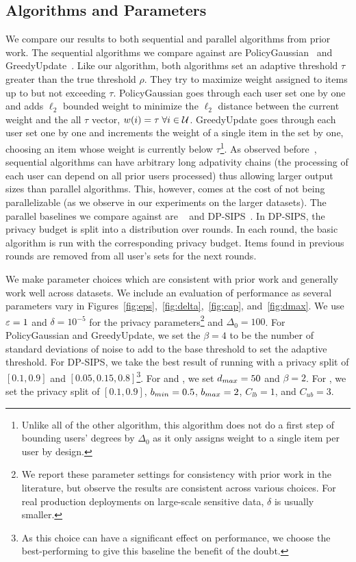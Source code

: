 \subsection{Algorithms and Parameters}

We compare our results to both sequential and parallel algorithms from prior work. The sequential algorithms we compare against are PolicyGaussian~\cite{gopi2020dpunion} and GreedyUpdate~\cite{carvalho2022incorporatingitem}. Like our algorithm, both algorithms set an adaptive threshold $\tau$ greater than the true threshold $\rho$. They try to maximize weight assigned to items up to but not exceeding $\tau$. PolicyGaussian goes through each user set one by one and adds $\ell_2$ bounded weight to minimize the $\ell_2$ distance between the current weight and the all $\tau$ vector, $w(i) = \tau \; \forall i \in \mathcal{U}$. GreedyUpdate goes through each user set one by one and increments the weight of a single item in the set by one, choosing an item whose weight is currently below $\tau$\footnote{Unlike all of the other algorithm, this algorithm does not do a first step of bounding users' degrees by $\Delta_0$ as it only assigns weight to a single item per user by design.}.
As observed before~\cite{swanberg2023dpsips}, sequential algorithms can have arbitrary long adpativity chains (the processing of each user can depend on all prior users processed) thus allowing larger output sizes than parallel algorithms. This, however, comes at the cost of not being parallelizable (as we observe in our experiments on the larger datasets).     
The parallel baselines we compare against are \basicalgo{}~\cite{korolova2009releasing, gopi2020dpunion} and DP-SIPS~\cite{swanberg2023dpsips}. In DP-SIPS, the privacy budget is split into a distribution over rounds. In each round, the basic algorithm is run with the corresponding privacy budget. Items found in previous rounds are removed from all user's sets for the next rounds.

We make parameter choices which are consistent with prior work and generally work well across datasets.
We include an evaluation of performance as several parameters vary in Figures~\ref{fig:eps},~\ref{fig:delta},~\ref{fig:cap}, and~\ref{fig:dmax}.
We use $\varepsilon = 1$ and $\delta=10^{-5}$ for the privacy parameters\footnote{We report these parameter settings for consistency with prior work in the literature, but observe the results are consistent across various choices. For real production deployments on large-scale sensitive data, $\delta$ is usually smaller.} and $\Delta_0 = 100$.
For PolicyGaussian and GreedyUpdate, we set the $\beta=4$ to be the number of standard deviations of noise to add to the base threshold to set the adaptive threshold.
For DP-SIPS, we take the best result of running with a privacy split of $[0.1, 0.9]$ and $[0.05, 0.15, 0.8]$\footnote{As this choice can have a significant effect on performance, we choose the best-performing to give this baseline the benefit of the doubt.}.
For \ouralgo{} and \ouralgotworounds{}, we set $d_{max}=50$ and $\beta=2$.
For \ouralgotworounds{}, we set the privacy split of $[0.1,0.9]$, $b_{min}=0.5$, $b_{max}=2$, $C_{lb}=1$, and $C_{ub}=3$.

